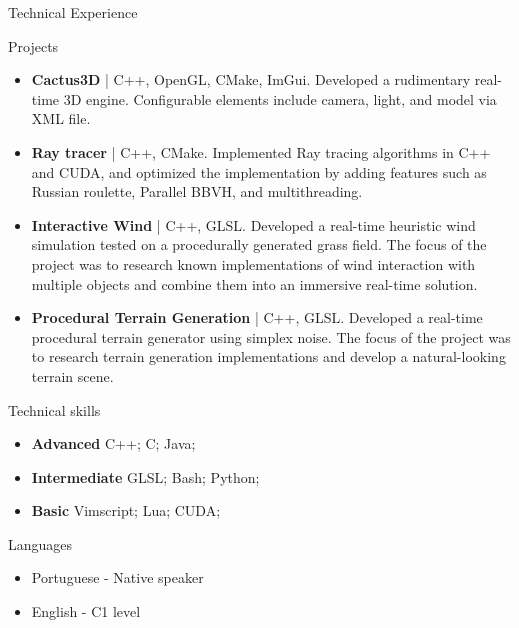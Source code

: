 \documentclass[]{mcdowellcv}
\begin{document}
	\begin{cvsection}{Technical Experience}
		\begin{cvsubsection}{Projects}{}{}
			\begin{itemize}
				\item \textbf{Cactus3D} | C++, OpenGL, CMake, ImGui. 
				Developed a rudimentary real-time 3D engine. Configurable elements include camera, light, and model via XML file.
				\item \textbf{Ray tracer} | C++, CMake.
				Implemented Ray tracing algorithms in C++ and CUDA, and optimized the implementation by adding features such as Russian roulette, Parallel BBVH, and multithreading.
		               	\item \textbf{Interactive Wind} | C++, GLSL.
				Developed a real-time heuristic wind simulation tested on a procedurally generated grass field. The focus of the project was to research known implementations of wind interaction with multiple objects and combine them into an immersive real-time solution.
                		\item \textbf{Procedural Terrain Generation} | C++, GLSL.
				Developed a real-time procedural terrain generator using simplex noise. The focus of the project was to research terrain generation implementations and develop a natural-looking terrain scene.

			\end{itemize}
		\end{cvsubsection}
	\end{cvsection}

	\begin{cvsection}{Technical skills}
		\begin{cvsubsection}{}{}{}
			\begin{itemize}
				\item \textbf{Advanced} C++; C; Java;
				\item \textbf{Intermediate} GLSL; Bash; Python;
				\item \textbf{Basic} Vimscript; Lua; CUDA;
			\end{itemize}
		\end{cvsubsection}
	\end{cvsection}

	\begin{cvsection}{Languages}
		\begin{cvsubsection}{}{}{}
			\begin{itemize}
				\item Portuguese - Native speaker
				\item English - C1 level
			\end{itemize}
		\end{cvsubsection}
	\end{cvsection}
\end{document}
